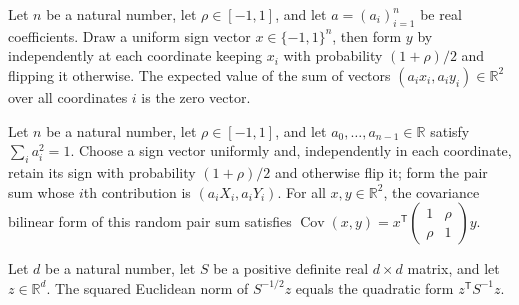 \begin{theorem}
\label{FABL.integral_regularThresholdPairSum_eq_zero}
\leanok
{}
Let $n$ be a natural number, let $\rho\in[-1,1]$, and let $a=(a_i)_{i=1}^n$ be real
coefficients. Draw a uniform sign vector $x\in\{-1,1\}^n$, then form $y$ by
independently at each coordinate keeping $x_i$ with probability $(1+\rho)/2$ and
flipping it otherwise. The expected value of the sum of vectors $(a_i x_i,a_i
y_i)\in\mathbb R^2$ over all coordinates $i$ is the zero vector.
\end{theorem}

\begin{theorem}
\label{FABL.covarianceBilin_regularThresholdPairSum}
\leanok
{}
Let $n$ be a natural number, let $\rho\in[-1,1]$, and let $a_0,\ldots,a_{n-1}\in\mathbb
R$ satisfy $\sum_i a_i^2=1$. Choose a sign vector uniformly and, independently in each
coordinate, retain its sign with probability $(1+\rho)/2$ and otherwise flip it; form
the pair sum whose $i$th contribution is $(a_i X_i,a_i Y_i)$. For all $x,y\in\mathbb
R^2$, the covariance bilinear form of this random pair sum satisfies
$\operatorname{Cov}(x,y)=x^{\mathsf T}\begin{pmatrix}1&\rho\\\rho&1\end{pmatrix}y$.
\end{theorem}

\begin{theorem}
\label{FABL.bentkusWhitening_norm_sq_eq_inv_quadraticForm}
\leanok
{}
Let $d$ be a natural number, let $S$ be a positive definite real $d\times d$ matrix, and
let $z\in\mathbb R^d$. The squared Euclidean norm of $S^{-1/2}z$ equals the quadratic
form $z^{\mathsf T}S^{-1}z$.
\end{theorem}

